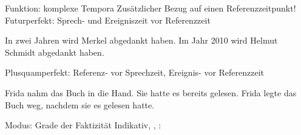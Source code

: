 \begin{frame}
  {Funktion: komplexe Tempora}
  \pause
  Zusätzlicher Bezug auf einen Referenzzeitpunkt!\\
  \Zeile
  \pause
  \alert{Futurperfekt: Sprech- und Ereigniszeit vor Referenzzeit}
  \pause
  \begin{exe}
    \ex In zwei Jahren \alert{wird} Merkel \alert{abgedankt haben}.
    \pause
    \ex Im Jahr 2010 \alert{wird} Helmut Schmidt \alert{abgedankt haben}.
  \end{exe}
  \pause
  \Zeile
  \alert{Plusquamperfekt: Referenz- vor Sprechzeit, Ereignis- vor Referenzzeit}
  \pause
  \begin{exe}
    \ex Frida nahm das Buch in die Hand. Sie \alert{hatte} es bereits \alert{gelesen}.
      \pause
    \ex Frida legte das Buch weg, nachdem sie es \alert{gelesen hatte}.
  \end{exe}
\end{frame}

\begin{frame}
  {Modus: Grade der Faktizität}
  \pause
  \alert{Indikativ}, , :
  \pause
  \small
  \begin{exe}
    \ex
    \begin{xlist}
    \end{xlist}
    \pause
    \ex
    \begin{xlist}
    \end{xlist}
    \pause
    \ex
    \begin{xlist}
    \end{xlist}
    \pause
    \ex
    \begin{xlist}
    \end{xlist}
  \end{exe}
\end{frame}

